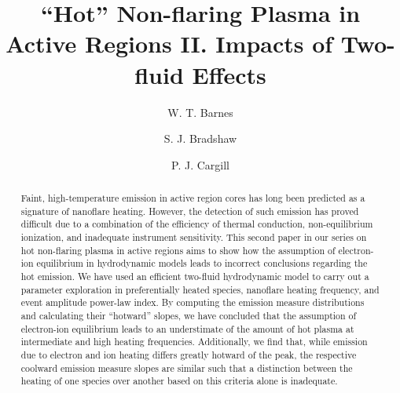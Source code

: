 \documentclass[tighten,apj]{emulateapj}
\begin{document}
	\title{``Hot'' Non-flaring Plasma in Active Regions II. Impacts of Two-fluid Effects}
	\author{W. T. Barnes}
	\author{S. J. Bradshaw}
	\author{P. J. Cargill}
	\begin{abstract}
		Faint, high-temperature emission in active region cores has long been predicted as a signature of nanoflare heating. However, the detection of such emission has proved difficult due to a combination of the efficiency of thermal conduction, non-equilibrium ionization, and inadequate instrument sensitivity. This second paper in our series on hot non-flaring plasma in active regions aims to show how the assumption of electron-ion equilibrium in hydrodynamic models leads to incorrect conclusions regarding the hot emission. We have used an efficient two-fluid hydrodynamic model to carry out a parameter exploration in preferentially heated species, nanoflare heating frequency, and event amplitude power-law index. By computing the emission measure distributions and calculating their ``hotward'' slopes, we have concluded that the assumption of electron-ion equilibrium leads to an understimate of the amount of hot plasma at intermediate and high heating frequencies. Additionally, we find that, while emission due to electron and ion heating differs greatly hotward of the peak, the respective coolward emission measure slopes are similar such that a distinction between the heating of one species over another based on this criteria alone is inadequate. 
	\end{abstract}
\end{document}

